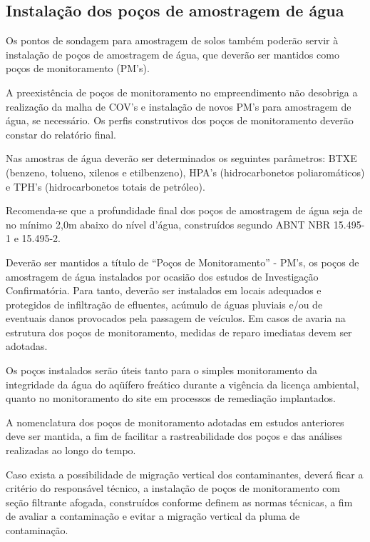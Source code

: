 \subsection{Instalação dos poços de amostragem de água}

Os pontos de sondagem para amostragem de solos também 
poderão servir à instalação de poços de amostragem de água, 
que deverão ser mantidos como poços de monitoramento (PM’s).

A preexistência de poços de monitoramento no empreendimento 
não desobriga a realização da malha de COV’s e instalação 
de novos PM’s para amostragem de água, se necessário. Os 
perfis construtivos dos poços de monitoramento deverão 
constar do relatório final.

Nas amostras de água deverão ser determinados os seguintes 
parâmetros: BTXE (benzeno, tolueno, xilenos e etilbenzeno), 
HPA’s (hidrocarbonetos poliaromáticos) e TPH’s 
(hidrocarbonetos totais de petróleo).

Recomenda-se que a profundidade final dos poços de 
amostragem de água seja de no mínimo 2,0m abaixo do nível 
d’água, construídos segundo ABNT NBR 15.495-1 e 15.495-2.

Deverão ser mantidos a título de “Poços de Monitoramento” - 
PM’s, os poços de amostragem de água instalados por ocasião 
dos estudos de Investigação Confirmatória. Para tanto, 
deverão ser instalados em locais adequados e protegidos de 
infiltração de efluentes, acúmulo de águas pluviais e/ou de 
eventuais danos provocados pela passagem de veículos. Em 
casos de avaria na estrutura dos poços de monitoramento, 
medidas de reparo imediatas devem ser adotadas.

Os poços instalados serão úteis tanto para o simples 
monitoramento da integridade da água do aqüífero freático 
durante a vigência da licença ambiental, quanto no 
monitoramento do site em processos de remediação 
implantados.

A nomenclatura dos poços de monitoramento adotadas em 
estudos anteriores deve ser mantida, a fim de facilitar a 
rastreabilidade dos poços e das análises realizadas ao 
longo do tempo.

Caso exista a possibilidade de migração vertical dos 
contaminantes, deverá ficar a critério do responsável 
técnico, a instalação de poços de monitoramento com seção 
filtrante afogada, construídos conforme definem as normas 
técnicas, a fim de avaliar a contaminação e evitar a 
migração vertical da pluma de contaminação.

